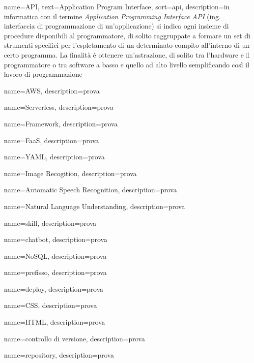 
{
	name=API,
	text=Application Program Interface,
	sort=api,
	description={in informatica con il termine \emph{Application Programming Interface API} (ing. interfaccia di programmazione di un'applicazione) si indica ogni insieme di procedure disponibili al programmatore, di solito raggruppate a formare un set di strumenti specifici per l'espletamento di un determinato compito all'interno di un certo programma. La finalità è ottenere un'astrazione, di solito tra l'hardware e il programmatore o tra software a basso e quello ad alto livello semplificando così il lavoro di programmazione}
}



{
	name=AWS,
	description={prova}
}

{
	name=Serverless,
	description={prova}
}

{
	name=Framework,
	description={prova}
}

{
	name=FaaS,
	description={prova}
}

{
	name=YAML,
	description={prova}
}

{
	name=Image Recogition,
	description={prova}
}

{
	name=Automatic Speech Recognition,
	description={prova}
}

{
	name=Natural Language Understanding,
	description={prova}
}

{
	name=skill,
	description={prova}
}

{
	name=chatbot,
	description={prova}
}

{
	name=NoSQL,
	description={prova}
}

{
	name=prefisso,
	description={prova}
}

{
	name=deploy,
	description={prova}
}

{
	name=CSS,
	description={prova}
}

{
	name=HTML,
	description={prova}
}

{
	name=controllo di versione,
	description={prova}
}

{
	name=repository,
	description={prova}
}